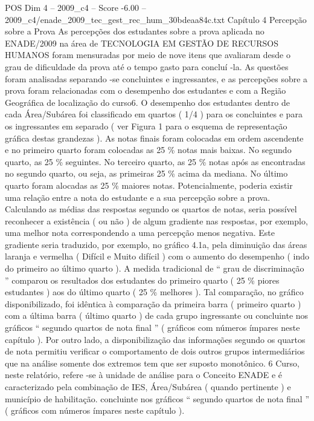 \begin{textsample}{POS Dim 4 – 2009\_c4 – Score -6.00 – 2009\_c4/enade\_2009\_tec\_gest\_rec\_hum\_30bdeaa84c.txt}  \label{ex:f4_pos_338}
Capítulo 4 Percepção sobre a Prova As percepções dos estudantes sobre a prova aplicada no ENADE/2009 na área de TECNOLOGIA EM GESTÃO DE RECURSOS HUMANOS foram mensuradas por meio de nove itens que avaliaram desde o grau de dificuldade da prova até o tempo gasto para concluí -la.
As questões foram analisadas separando -se concluintes e ingressantes, e as percepções sobre a prova foram relacionadas com o desempenho dos estudantes e com a Região Geográfica de localização do curso6.
O desempenho dos estudantes dentro de cada Área/Subárea foi classificado em quartos ( 1/4 ) para os concluintes e para os ingressantes em separado ( ver Figura 1 para o esquema de representação gráfica destas grandezas ).
As notas finais foram colocadas em ordem ascendente e no primeiro quarto foram colocadas as 25 \% notas mais baixas.
No segundo quarto, as 25 \% seguintes.
No terceiro quarto, as 25 \% notas após as encontradas no segundo quarto, ou seja, as primeiras 25 \% acima da mediana.
No último quarto foram alocadas as 25 \% maiores notas.
Potencialmente, poderia existir uma relação entre a nota do estudante e a sua percepção sobre a prova.
Calculando as médias das respostas segundo os quartos de notas, seria possível reconhecer a existência ( ou não ) de algum gradiente nas respostas, por exemplo, uma melhor nota correspondendo a uma percepção menos negativa.
Este gradiente seria traduzido, por exemplo, no gráfico 4.1a, pela diminuição das áreas laranja e vermelha ( Difícil e Muito difícil ) com o aumento do desempenho ( indo do primeiro ao último quarto ).
A medida tradicional de “ grau de discriminação ” comparou os resultados dos estudantes do primeiro quarto ( 25 \% piores estudantes ) aos do último quarto ( 25 \% melhores ).
Tal comparação, no gráfico disponibilizado, foi idêntica à comparação da primeira barra ( primeiro quarto ) com a última barra ( último quarto ) de cada grupo ingressante ou concluinte nos gráficos “ segundo quartos de nota final ” ( gráficos com números ímpares neste capítulo ).
Por outro lado, a disponibilização das informações segundo os quartos de nota permitiu verificar o comportamento de dois outros grupos intermediários que na análise somente dos extremos tem que ser suposto monotônico. 6 Curso, neste relatório, refere -se à unidade de análise para o Conceito ENADE e é caracterizado pela combinação de IES, Área/Subárea ( quando pertinente ) e município de habilitação. concluinte nos gráficos “ segundo quartos de nota final ” ( gráficos com números ímpares neste capítulo ).

\end{textsample}
